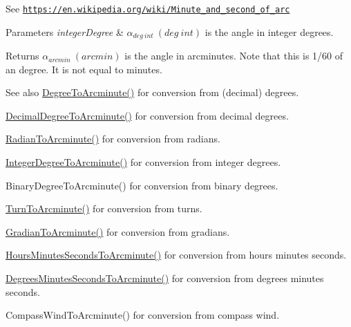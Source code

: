 See \href{https://en.wikipedia.org/wiki/Minute_and_second_of_arc}{\tt https\+://en.\+wikipedia.\+org/wiki/\+Minute\+\_\+and\+\_\+second\+\_\+of\+\_\+arc} 
\begin{DoxyParams}{Parameters}
{\em integer\+Degree} & $\alpha_{deg\ int}\ (deg\ int)$ is the angle in integer degrees. \\
\hline
\end{DoxyParams}
\begin{DoxyReturn}{Returns}
$\alpha_{arcmin}\ (arcmin)$ is the angle in arcminutes. Note that this is 1/60 of an degree. It is not equal to minutes. 
\end{DoxyReturn}
\begin{DoxySeeAlso}{See also}
\mbox{\hyperlink{group___e_g_x_math-_angle_conversions-_degree_ga8abf327dc5f52907b2c881999e9cc43e}{Degree\+To\+Arcminute()}} for conversion from (decimal) degrees. 

\mbox{\hyperlink{group___e_g_x_math-_angle_conversions-_decimal_degree_ga6b6ea6e45d2a13f556824ca419cc9fbd}{Decimal\+Degree\+To\+Arcminute()}} for conversion from decimal degrees. 

\mbox{\hyperlink{group___e_g_x_math-_angle_conversions-_radian_ga722e3b8e78540a6b3942b73b64aeb8d2}{Radian\+To\+Arcminute()}} for conversion from radians. 

\mbox{\hyperlink{group___e_g_x_math-_angle_conversions-_integer_degree_ga78b014e7649d666a3647c467e64e4fe8}{Integer\+Degree\+To\+Arcminute()}} for conversion from integer degrees. 

Binary\+Degree\+To\+Arcminute() for conversion from binary degrees. 

\mbox{\hyperlink{group___e_g_x_math-_angle_conversions-_turn_ga72cda928d9043c7d82097b1a7920769e}{Turn\+To\+Arcminute()}} for conversion from turns. 

\mbox{\hyperlink{group___e_g_x_math-_angle_conversions-_gradian_ga67ef7daad49b0d73c39c52d426ab46a5}{Gradian\+To\+Arcminute()}} for conversion from gradians. 

\mbox{\hyperlink{group___e_g_x_math-_angle_conversions-_hours_minutes_seconds_ga23bfa5abeb014726c2e2ac6303be5dae}{Hours\+Minutes\+Seconds\+To\+Arcminute()}} for conversion from hours minutes seconds. 

\mbox{\hyperlink{group___e_g_x_math-_angle_conversions-_degrees_minutes_seconds_gadb8da2c4b9cdd4f618b6281314b1318c}{Degrees\+Minutes\+Seconds\+To\+Arcminute()}} for conversion from degrees minutes seconds. 

Compass\+Wind\+To\+Arcminute() for conversion from compass wind. 
\end{DoxySeeAlso}
\mbox{\label{group___e_g_x_math-_angle_conversions-_integer_degree_gaa04058a2fea3dc3678264a05fac6e1ae}} 
